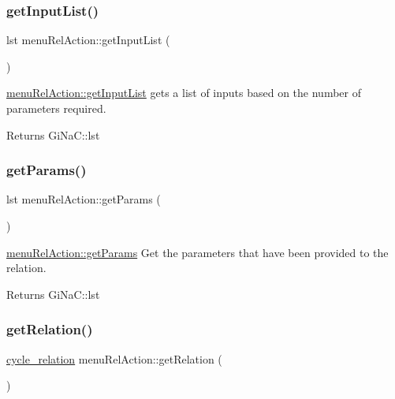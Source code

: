 \subsubsection{\texorpdfstring{get\+Input\+List()}{getInputList()}}
{\footnotesize\ttfamily lst menu\+Rel\+Action\+::get\+Input\+List (\begin{DoxyParamCaption}{ }\end{DoxyParamCaption})}



\mbox{\hyperlink{classmenu_rel_action_a8ec0134231f519695901fa4d750fab4a}{menu\+Rel\+Action\+::get\+Input\+List}} gets a list of inputs based on the number of parameters required. 

\begin{DoxyReturn}{Returns}
Gi\+Na\+C\+::lst 
\end{DoxyReturn}
\mbox{\label{classmenu_rel_action_a8da5cc4f4063d4ea465d67b0aabc57e7}} 
\subsubsection{\texorpdfstring{get\+Params()}{getParams()}}
{\footnotesize\ttfamily lst menu\+Rel\+Action\+::get\+Params (\begin{DoxyParamCaption}{ }\end{DoxyParamCaption})}



\mbox{\hyperlink{classmenu_rel_action_a8da5cc4f4063d4ea465d67b0aabc57e7}{menu\+Rel\+Action\+::get\+Params}} Get the parameters that have been provided to the relation. 

\begin{DoxyReturn}{Returns}
Gi\+Na\+C\+::lst 
\end{DoxyReturn}
\mbox{\label{classmenu_rel_action_a34deae132c511b7e34af97585df9245c}} 
\subsubsection{\texorpdfstring{get\+Relation()}{getRelation()}}
{\footnotesize\ttfamily \mbox{\hyperlink{class_moeb_inv_1_1cycle__relation}{cycle\+\_\+relation}} menu\+Rel\+Action\+::get\+Relation (\begin{DoxyParamCaption}{ }\end{DoxyParamCaption})}



